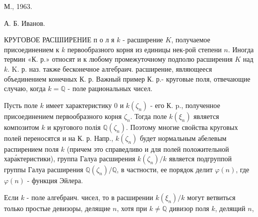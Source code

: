 \documentclass[10pt]{article}
\begin{document}
М., 1963.

А. Б. Иванов.



КРУГОВОЕ РАСШІИРЕНИЕ п о л я $k$ - расширение $K$, получаемое присоединением к $k$ первообразного корня из единицы нек-рой степени $n$. Иногда термин «К. р.» относят и к любому промежуточному подполю расширения $K$ над $k$. K. р. наз. также бесконечное алгебраич. расширение, являющееся объединением конечных К. р. Важный пример К. р.- круговые поля, отвечающие случаю, когда $k=\mathbb{Q}$ - поле рациональных чисел.



Пусть поле $k$ имеет характеристику 0 и $k\left(\zeta_{n}\right)$ - его К. p., полученное присоединением первообразного корня $\zeta_{n}$. Тогда поле $k\left(\xi_{n}\right)$ является композитом $k$ и кругового полія $\mathbb{Q}\left(\zeta_{n}\right)$. Поэтому многие свойства круговых полей переносятся и на К. р. Напр., $k\left(\zeta_{n}\right)$ будет нормальным абелевым распирением поля $k$ (причем это справедливо и для полей положительной хара́ктеристики), группа Галуа расширения $k\left(\zeta_{n}\right) / k$ является подгруппой группы Галуа расширения $\mathbb{Q}\left(\zeta_{n}\right) / \mathbb{Q}$, в частности, ее порядок делит $\varphi(n)$, где $\varphi(n)$ - функция Эйлера.



Если $k$ - поле алгебраич. чисел, то в расширении $k\left(\xi_{n}\right) / k$ могут ветвиться только простые девизоры, делящие $n$, хотя при $k \neq \mathbb{Q}$ дивизор поля $k$, делящий $n$,
\end{document}
